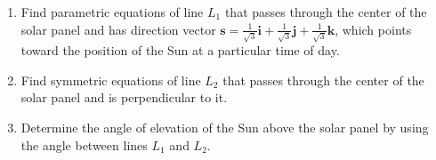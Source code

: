 \documentclass{exercises}
\begin{document}
\begin{enumerate}[resume]
\begin{enumerate}[label=(\alph*)]
  \item Find parametric equations of line $L_{1}$ that passes through the center of the solar panel and has direction vector $\mathbf{s}=\frac{1}{\sqrt{3}}\mathbf{i}+\frac{1}{\sqrt{3}}\mathbf{j}+\frac{1}{\sqrt{3}}\mathbf{k}$, which points toward the position of the Sun at a particular time of day.
  \item Find symmetric equations of line $L_{2}$ that passes through the center of the solar panel and is perpendicular to it.
  \item Determine the angle of elevation of the Sun above the solar panel by using the angle between lines $L_{1}$ and $L_{2}$.
\end{enumerate}
\end{enumerate}
\end{document}
